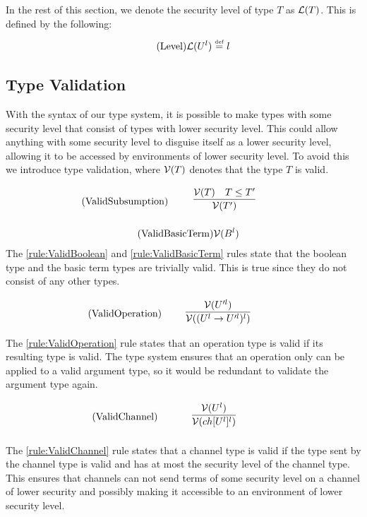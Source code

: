 In the rest of this section, we denote the security level of type $T$ as $\mathcal{L}(T)$.
This is defined by the following:
\begin{align*}
    \tag{Level}\mathcal{L}(U^l)\overset{\underset{\mathrm{def}}{}}{=} l
\end{align*}

\subsection{Type Validation}
With the syntax of our type system, it is possible to make types with some security level that consist of types with lower security level.
This could allow anything with some security level to disguise itself as a lower security level, allowing it to be accessed by environments of lower security level.
To avoid this we introduce type validation, where $\mathcal{V}(T)$ denotes that the type $T$ is valid.

\begin{align*}
\tag{ValidSubsumption}\label{rule:ValidSublevel} &\infrule{\valid{T}\quad T\leq T'}{\valid{T'}}
\end{align*}

\begin{align*}
    \tag{ValidBasicTerm}\label{rule:ValidBasicTerm} &\mathcal{V}(B^l)
\end{align*}
The \ref{rule:ValidBoolean} and \ref{rule:ValidBasicTerm} rules state that the boolean type and the basic term types are trivially valid.
This is true since they do not consist of any other types.

\begin{align*}
    \tag{ValidOperation}\label{rule:ValidOperation} &\infrule{\valid{U'^l}}{\valid{(U^l\ra U'^l)^{l}}}
\end{align*}
The \ref{rule:ValidOperation} rule states that an operation type is valid if its resulting type is valid.
The type system ensures that an operation only can be applied to a valid argument type, so it would be redundant to validate the argument type again.

\begin{align*}
    \tag{ValidChannel}\label{rule:ValidChannel} &\infrule{\valid{U^l}}{\valid{ch[U^l]^{l}}}
\end{align*}

The \ref{rule:ValidChannel} rule states that a channel type is valid if the type sent by the channel type is valid and has at most the security level of the channel type.
This ensures that channels can not send terms of some security level on a channel of lower security and possibly making it accessible to an environment of lower security level.

